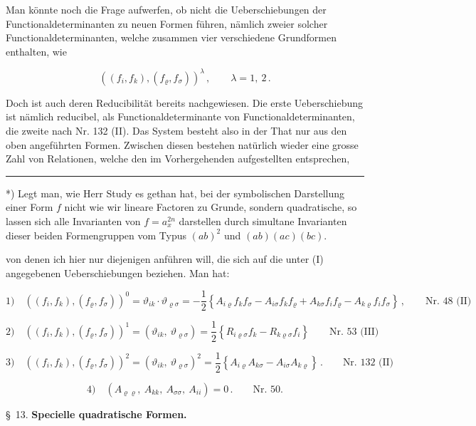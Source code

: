 \documentclass[11pt]{article}
\providecommand{\weberpage}[1]{}
\begin{document}
Man k\"onnte noch die Frage aufwerfen, ob nicht die Ueberschiebungen der Functionaldeterminanten zu neuen Formen f\"uhren, n\"amlich zweier solcher Functionaldeterminanten, welche zusammen vier verschiedene Grundformen enthalten, wie

\[
((f_i, f_k), (f_\varrho, f_\sigma))^\lambda\,, \qquad \lambda = 1,\ 2\,. \tag{I}
\]

Doch ist auch deren Reducibilit\"at bereits nachgewiesen. Die erste Ueberschiebung ist n\"amlich reducibel, als Functionaldeterminante von Functionaldeterminanten, die zweite nach Nr. 132 (II). Das System besteht also in der That nur aus den oben angef\"uhrten Formen. Zwischen diesen bestehen nat\"urlich wieder eine grosse Zahl von Relationen, welche den im Vorhergehenden aufgestellten entsprechen,

\noindent\rule{4cm}{0.4pt}

*) Legt man, wie Herr Study es gethan hat, bei der symbolischen Darstellung einer Form $f$ nicht wie wir lineare Factoren zu Grunde, sondern quadratische, so lassen sich alle Invarianten von $f = a_x^{2n}$ darstellen durch simultane Invarianten dieser beiden Formengruppen vom Typus $(ab)^2$ und $(ab)(ac)(bc)$.


\weberpage{156}

von denen ich hier nur diejenigen anf\"uhren will, die sich auf die unter (I) angegebenen Ueberschiebungen beziehen. Man hat:

\[
1)\quad ((f_i, f_k), (f_\varrho, f_\sigma))^0 = \vartheta_{ik}\cdot\vartheta_{\varrho\sigma}
= -\frac{1}{2}\left\{ A_{i\varrho} f_k f_\sigma - A_{i\sigma} f_k f_\varrho + A_{k\sigma} f_i f_\varrho - A_{k\varrho} f_i f_\sigma \right\}\,, \qquad \text{Nr. 48 (II)}
\]

\[
2)\quad ((f_i, f_k), (f_\varrho, f_\sigma))^1 = (\vartheta_{ik},\ \vartheta_{\varrho\sigma})
= \frac{1}{2}\left\{ R_{i\varrho\sigma} f_k - R_{k\varrho\sigma} f_i \right\} \qquad \text{Nr. 53 (III)}
\]

\[
3)\quad ((f_i, f_k), (f_\varrho, f_\sigma))^2 = (\vartheta_{ik},\ \vartheta_{\varrho\sigma})^2
= \frac{1}{2}\left\{ A_{i\varrho} A_{k\sigma} - A_{i\sigma} A_{k\varrho} \right\}\,. \qquad \text{Nr. 132 (II)}
\]

\[
4)\quad (A_{\varrho\varrho},\ A_{kk},\ A_{\sigma\sigma},\ A_{ii}) = 0\,. \qquad \text{Nr. 50.}
\]

\begin{center}
\S\ 13. \textbf{Specielle quadratische Formen.}
\end{center}
\end{document}
